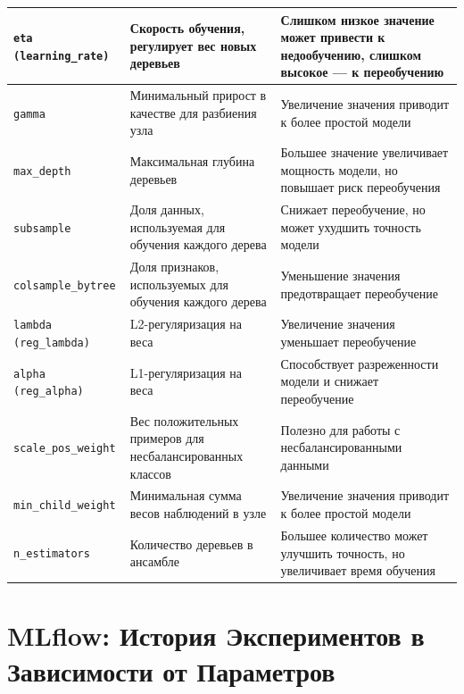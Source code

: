 \documentclass[14pt, a4paper]{bsu}
\begin{document}
\begin{longtable}{|p{4cm}|p{6cm}|p{6cm}|}
	\texttt{eta (learning\_rate)}                     & Скорость обучения, регулирует вес новых
	деревьев                                          & Слишком низкое значение может привести к недообучению,
	слишком высокое — к переобучению                                                                                                \\ \hline \texttt{gamma}                &
	Минимальный прирост в качестве для разбиения узла & Увеличение
	значения приводит к более простой модели
	\\ \hline \texttt{max\_depth}           & Максимальная глубина деревьев
	                                                  & Большее значение увеличивает мощность модели, но повышает риск переобучения
	\\ \hline \texttt{subsample}            & Доля данных, используемая для
	обучения каждого дерева                           & Снижает переобучение, но может ухудшить
	точность модели                                                                                                                 \\ \hline
	\texttt{colsample\_bytree}                        & Доля признаков, используемых для обучения
	каждого дерева                                    & Уменьшение значения предотвращает переобучение
	\\ \hline \texttt{lambda (reg\_lambda)} & L2-регуляризация на веса
	                                                  & Увеличение значения уменьшает переобучение
	\\ \hline \texttt{alpha (reg\_alpha)}   & L1-регуляризация на веса
	                                                  & Способствует разреженности модели и снижает переобучение
	\\ \hline \texttt{scale\_pos\_weight}   & Вес положительных примеров для
	несбалансированных классов                        & Полезно для работы с несбалансированными данными
	\\ \hline \texttt{min\_child\_weight}   & Минимальная сумма весов наблюдений
	в узле                                            & Увеличение значения приводит к более простой модели
	\\ \hline \texttt{n\_estimators}        & Количество деревьев в ансамбле
	                                                  & Большее количество может улучшить точность, но увеличивает время обучения
	\\\end{longtable}


\chapter{MLflow: История Экспериментов в Зависимости от Параметров}
\end{document}

